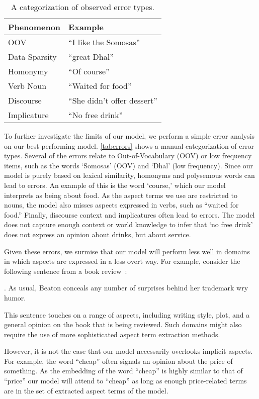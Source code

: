 \documentclass[11pt,a4paper]{article}
\begin{document}
\begin{table}[t]
\begin{tabular}{ll}
\textbf{Phenomenon}  & \textbf{Example}         \\
\midrule
OOV         & ``I like the Somosas''  \\
Data Sparsity & ``great Dhal'' \\
Homonymy    & ``Of course''      \\
Verb  Noun & ``Waited for food'' \\
Discourse   & ``She didn't offer dessert''  \\
Implicature & ``No free drink''
\end{tabular}
\caption{A categorization of observed error types.}
\label{taberrors}
\end{table}

To further investigate the limits of our model, we perform a simple error analysis on our best performing model.
\autoref{taberrors} shows a manual categorization
of error types.
Several of the errors relate to Out-of-Vocabulary (OOV) or low frequency items, such as the words `Somosas' (OOV) and `Dhal' (low frequency).
Since our model is purely based on lexical similarity, homonyms and polysemous words can lead to errors. 
An example of this is the word `course,'
which our model interprets as being about food.
As the aspect terms we use are restricted to nouns,
the model also misses aspects expressed in verbs, such as ``waited for food.''
Finally, discourse context and implicatures often lead to errors.
The model does not capture enough context or world knowledge to infer that `no free drink' does not express an opinion about drinks, but about service.

Given these errors, we surmise that our model will perform less well in domains in which aspects are expressed in a less overt way.
For example, consider the following sentence from a book review~\citep{kirkus2019review}:

\ex. As usual, Beaton conceals any number of surprises behind her trademark wry humor.

This sentence touches on a range of aspects, including writing style, plot, and a general opinion on the book that is being reviewed.
Such domains might also require the use of more sophisticated aspect term extraction methods.

However, it is not the case that our model necessarily overlooks implicit aspects. For example, the word ``cheap''  often signals an opinion about the price of something. 
As the embedding of the word ``cheap'' is highly similar to that of ``price'' our model will attend to ``cheap'' as long as enough price-related terms are in the set of extracted aspect terms of the model.
\end{document}
